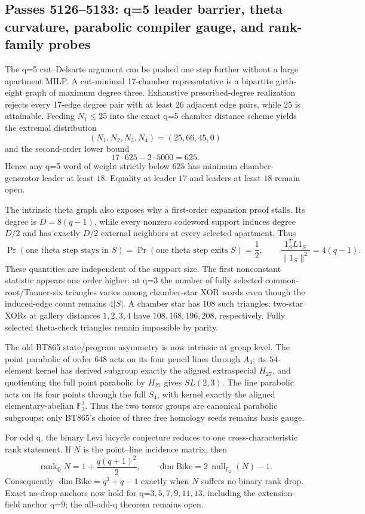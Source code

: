 \ifdefined\WPassFiveOneTwoSixLoaded\else
\gdef\WPassFiveOneTwoSixLoaded{1}
\subsection*{Passes 5126--5133: q=5 leader barrier, theta curvature, parabolic compiler gauge, and rank-family probes}
The q=5 cut--Delsarte argument can be pushed one step further without a large apartment MILP.  A cut-minimal 17-chamber representative is a bipartite girth-eight graph of maximum degree three.  Exhaustive prescribed-degree realization rejects every 17-edge degree pair with at least $26$ adjacent edge pairs, while $25$ is attainable.  Feeding $N_1\le25$ into the exact q=5 chamber distance scheme yields the extremal distribution
\[
 (N_1,N_2,N_3,N_4)=(25,66,45,0)
\]
and the second-order lower bound
\[
 17\cdot625-2\cdot5000=625.
\]
Hence any q=5 word of weight strictly below $625$ has minimum chamber-generator leader at least $18$.  Equality at leader $17$ and leaders at least $18$ remain open.

The intrinsic theta graph also exposes why a first-order expansion proof stalls.  Its degree is $D=8(q-1)$, while every nonzero codeword support induces degree $D/2$ and has exactly $D/2$ external neighbors at every selected apartment.  Thus
\[
 \Pr(\text{one theta step stays in }S)
 =\Pr(\text{one theta step exits }S)=\frac12,
\qquad
 \frac{1_S^TL1_S}{\|1_S\|^2}=4(q-1).
\]
These quantities are independent of the support size.  The first nonconstant statistic appears one order higher: at q=3 the number of fully selected common-root/Tanner-six triangles varies among chamber-star XOR words even though the induced-edge count remains $4|S|$.  A chamber star has $108$ such triangles; two-star XORs at gallery distances $1,2,3,4$ have $108,168,196,208$, respectively.  Fully selected theta-check triangles remain impossible by parity.

The old BT865 state/program asymmetry is now intrinsic at group level.  The point parabolic of order $648$ acts on its four pencil lines through $A_4$; its $54$-element kernel has derived subgroup exactly the aligned extraspecial $H_{27}$, and quotienting the full point parabolic by $H_{27}$ gives $SL(2,3)$.  The line parabolic acts on its four points through the full $S_4$, with kernel exactly the aligned elementary-abelian $\mathbb F_3^3$.  Thus the two torsor groups are canonical parabolic subgroups; only BT865's choice of three free homology seeds remains basis gauge.

For odd q, the binary Levi bicycle conjecture reduces to one cross-characteristic rank statement.  If $N$ is the point--line incidence matrix, then
\[
 \operatorname{rank}_{\mathbb Q}N=1+\frac{q(q+1)^2}{2},
 \qquad
 \dim \mathrm{Bike}=2\,\operatorname{null}_{\mathbb F_2}(N)-1.
\]
Consequently $\dim\mathrm{Bike}=q^3+q-1$ exactly when $N$ suffers no binary rank drop.  Exact no-drop anchors now hold for q=$3,5,7,9,11,13$, including the extension-field anchor q=$9$; the all-odd-q theorem remains open.

